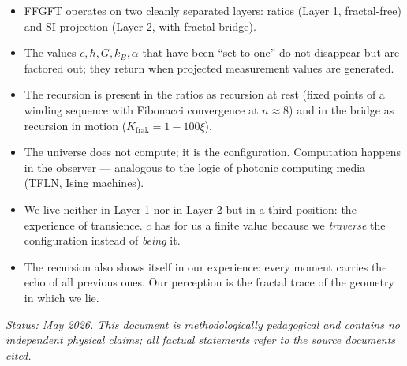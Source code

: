 \begin{itemize}\setlength\itemsep{2pt}
  \item FFGFT operates on two cleanly separated layers:
        ratios (Layer 1, fractal-free) and SI projection (Layer 2,
        with fractal bridge).
  \item The values $c, \hbar, G, k_B, \alpha$ that have been ``set to
        one'' do not disappear but are factored out; they return when
        projected measurement values are generated.
  \item The recursion is present in the ratios as recursion at rest
        (fixed points of a winding sequence with Fibonacci convergence
        at $n \approx 8$) and in the bridge as recursion in motion
        ($K_{\mathrm{frak}} = 1 - 100\xi$).
  \item The universe does not compute; it is the configuration.
        Computation happens in the observer --- analogous to the logic
        of photonic computing media (TFLN, Ising machines).
  \item We live neither in Layer 1 nor in Layer 2 but in a third
        position: the experience of transience. $c$ has for us a
        finite value because we \emph{traverse} the configuration
        instead of \emph{being} it.
  \item The recursion also shows itself in our experience: every
        moment carries the echo of all previous ones. Our perception
        is the fractal trace of the geometry in which we lie.
\end{itemize}

\medskip
\noindent\textit{Status: May 2026. This document is methodologically
pedagogical and contains no independent physical claims; all factual
statements refer to the source documents cited.}
